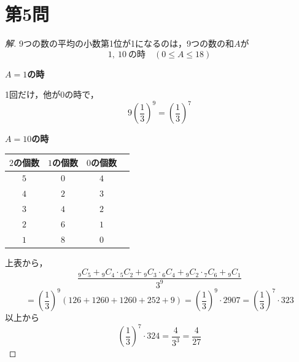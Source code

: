\documentclass[../main.tex]{subfiles}
\begin{document}
\newpage

\section*{第5問}

\begin{proof}[解]
  9つの数の平均の小数第1位が1になるのは，9つの数の和$A$が
  \[
    1,\ 10\ \text{の時}\quad(0\le A\le18)
  \]

  \textbf{$A=1$の時}

  1回だけ，他が0の時で，
  \[
    9\left(\frac13\right)^9=\left(\frac13\right)^7
  \]

  \textbf{$A=10$の時}

  \begin{center}
    \begin{tabular}{c|c|c|c}
      $2$の個数 & $1$の個数 & $0$の個数 & \\
      \hline
      $5$ & $0$ & $4$ & \\
      $4$ & $2$ & $3$ & \\
      $3$ & $4$ & $2$ & \\
      $2$ & $6$ & $1$ & \\
      $1$ & $8$ & $0$ &
    \end{tabular}
  \end{center}
  上表から，
  \[
    \frac{{}_9C_5+{}_9C_4\cdot{}_5C_2+{}_9C_3\cdot{}_6C_4+{}_9C_2\cdot{}_7C_6+{}_9C_1}{3^9}
  \]
  \[
    =\left(\frac13\right)^9(126+1260+1260+252+9)=\left(\frac13\right)^9\cdot2907=\left(\frac13\right)^7\cdot323
  \]
  以上から
  \[
    \left(\frac13\right)^7\cdot324=\frac{4}{3^3}=\frac{4}{27}
  \]
\end{proof}
\end{document}
